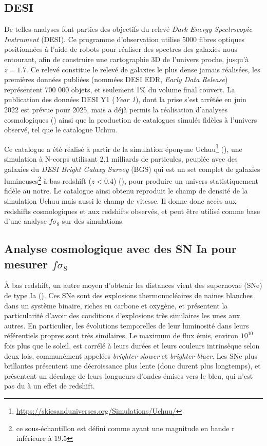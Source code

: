 \documentclass{book}
\begin{document}
\subsection{DESI}

De telles analyses font parties des objectifs du relevé \textit{Dark Energy Spectrscopic Instrument} (DESI). Ce programme d'observation utilise 5000 fibres optiques positionnées à l'aide de robots pour réaliser des spectres des galaxies nous entourant, afin de construire une cartographie 3D de l'univers proche, jusqu'à $z=1.7$. Ce relevé constitue le relevé de galaxies le plus dense jamais réalisées, les premières données publiées (nommées DESI EDR, \textit{Early Data Release}) représentent 700 000 objets, et seulement 1\% du volume final couvert. La publication des données DESI Y1 (\textit{Year 1}), dont la prise s'est arrêtée en juin 2022 est prévue pour 2025, mais a déjà permis la réalisation d'analyses cosmologiques (\cite{desi_collaboration_desi_2024-1,desi_collaboration_desi_2024-2, desi_collaboration_desi_2024}) ainsi que la production de catalogues simulés fidèles à l'univers observé, tel que le catalogue Uchuu.

Ce catalogue a été réalisé à partir de la simulation éponyme Uchuu\footnote{\href{https://skiesanduniverses.org/Simulations/Uchuu/}{https://skiesanduniverses.org/Simulations/Uchuu/}} (\cite{prada_desi_2023}), une simulation à N-corps utilisant 2.1 milliards de particules, peuplée avec des galaxies du \textit{DESI Bright Galaxy Survey} (BGS) qui est un set complet de galaxies lumineuses\footnote{ce sous-échantillon est défini comme ayant une magnitude en bande r inférieure à $19.5$} à bas redshift ($z<0.4$) (\cite{hahn_desi_2023}), pour produire un univers statistiquement fidèle au notre. Le catalogue ainsi obtenu reproduit le champ de densité de la simulation Uchuu mais aussi le champ de vitesse. Il donne donc accès aux redshifts cosmologiques et aux redshifts observés, et peut être utilisé comme base d'une analyse $f\sigma_8$ sur des simulations.


\subsection{Analyse cosmologique avec des SN Ia pour mesurer $f\sigma_8$}

À bas redshift, un autre moyen d'obtenir les distances vient des supernovae (SNe) de type Ia (\cite{hoyle_nucleosynthesis_1960}). Ces SNe sont des explosions thermonucléaires de naines blanches dans un système binaire, riches en carbone et oxygène, et présentent la particularité d’avoir des conditions d'explosions très similaires les unes aux autres. En particulier, les évolutions temporelles de leur luminosité dans leurs référentiels propres sont très similaires. Le maximum de flux émis, environ $10^{10}$ fois plus que le soleil, est corrélé à leurs durées et leurs couleurs intrinsèque selon deux lois, communément appelées \textit{brighter-slower} et \textit{brighter-bluer}. Les SNe plus brillantes présentent une décroissance plus lente (donc durent plus longtemps), et présentent un décalage de leurs longueurs d'ondes émises vers le bleu, qui n'est pas du à un effet de redshift.
\end{document}
